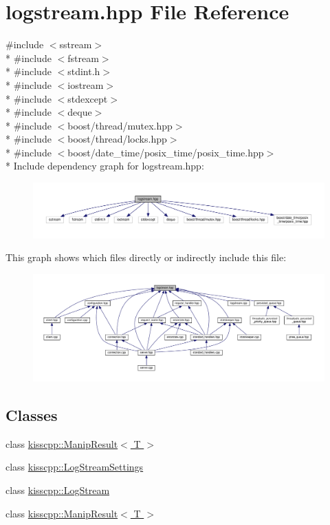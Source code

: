 \hypertarget{a00067}{\section{logstream.\-hpp File Reference}
\label{a00067}
}
{\ttfamily \#include $<$sstream$>$}\\*
{\ttfamily \#include $<$fstream$>$}\\*
{\ttfamily \#include $<$stdint.\-h$>$}\\*
{\ttfamily \#include $<$iostream$>$}\\*
{\ttfamily \#include $<$stdexcept$>$}\\*
{\ttfamily \#include $<$deque$>$}\\*
{\ttfamily \#include $<$boost/thread/mutex.\-hpp$>$}\\*
{\ttfamily \#include $<$boost/thread/locks.\-hpp$>$}\\*
{\ttfamily \#include $<$boost/date\-\_\-time/posix\-\_\-time/posix\-\_\-time.\-hpp$>$}\\*
Include dependency graph for logstream.\-hpp\-:\nopagebreak
\begin{figure}[H]
\begin{center}
\leavevmode
\includegraphics[width=350pt]{a00111}
\end{center}
\end{figure}
This graph shows which files directly or indirectly include this file\-:\nopagebreak
\begin{figure}[H]
\begin{center}
\leavevmode
\includegraphics[width=350pt]{a00112}
\end{center}
\end{figure}
\subsection*{Classes}
\begin{DoxyCompactItemize}
\item 
class \hyperlink{a00033}{kisscpp\-::\-Manip\-Result$<$ T $>$}
\item 
class \hyperlink{a00032}{kisscpp\-::\-Log\-Stream\-Settings}
\item 
class \hyperlink{a00031}{kisscpp\-::\-Log\-Stream}
\item 
class \hyperlink{a00033}{kisscpp\-::\-Manip\-Result$<$ T $>$}
\end{DoxyCompactItemize}
